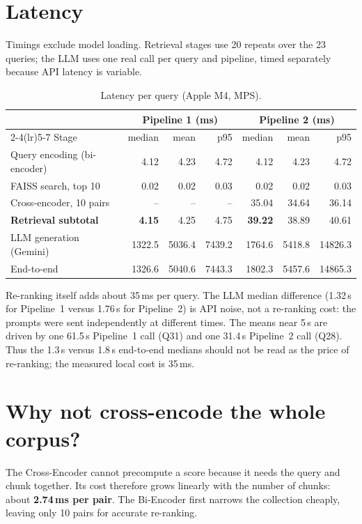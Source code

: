 \documentclass[10pt,a4paper]{article}
\begin{document}
\section{Latency}

Timings exclude model loading. Retrieval stages use 20 repeats over the 23 queries; the LLM uses one real call per query and pipeline, timed separately because API latency is variable.

\begin{table}[h]
\centering
\small
\begin{tabular}{lrrrrrr}
\toprule
 & \multicolumn{3}{c}{Pipeline 1 (ms)} & \multicolumn{3}{c}{Pipeline 2 (ms)} \\
\cmidrule(lr){2-4}\cmidrule(lr){5-7}
Stage & median & mean & p95 & median & mean & p95 \\
\midrule
Query encoding (bi-encoder) & 4.12 & 4.23 & 4.72 & 4.12 & 4.23 & 4.72 \\
FAISS search, top 10        & 0.02 & 0.02 & 0.03 & 0.02 & 0.02 & 0.03 \\
Cross-encoder, 10 pairs     & -- & -- & -- & 35.04 & 34.64 & 36.14 \\
\textbf{Retrieval subtotal} & \textbf{4.15} & 4.25 & 4.75 & \textbf{39.22} & 38.89 & 40.61 \\
LLM generation (Gemini)     & 1322.5 & 5036.4 & 7439.2 & 1764.6 & 5418.8 & 14826.3 \\
End-to-end                  & 1326.6 & 5040.6 & 7443.3 & 1802.3 & 5457.6 & 14865.3 \\
\bottomrule
\end{tabular}
\caption{Latency per query (Apple M4, MPS).}
\end{table}

Re-ranking itself adds about 35\,ms per query. The LLM median difference (1.32\,s for Pipeline~1 versus 1.76\,s for Pipeline~2) is API noise, not a re-ranking cost: the prompts were sent independently at different times. The means near 5\,s are driven by one 61.5\,s Pipeline~1 call (Q31) and one 31.4\,s Pipeline~2 call (Q28). Thus the 1.3\,s versus 1.8\,s end-to-end medians should not be read as the price of re-ranking; the measured local cost is 35\,ms.

\section{Why not cross-encode the whole corpus?}

The Cross-Encoder cannot precompute a score because it needs the query and chunk together. Its cost therefore grows linearly with the number of chunks: about \textbf{2.74\,ms per pair}. The Bi-Encoder first narrows the collection cheaply, leaving only 10 pairs for accurate re-ranking.
\end{document}
